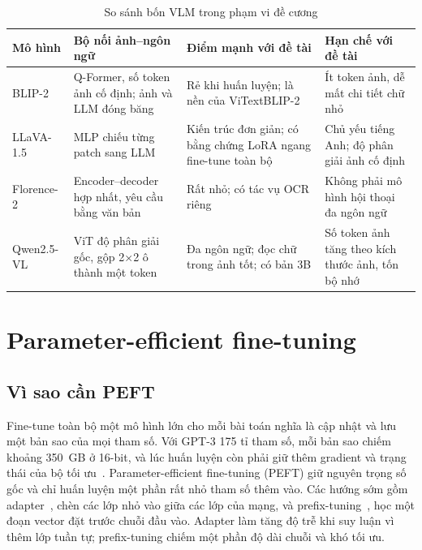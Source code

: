 \begin{table}[htbp]
\caption{So sánh bốn VLM trong phạm vi đề cương}
\label{tab:rel-vlm}
\centering
\small
\begin{tabular}{p{}p{}p{}p{}}
\toprule
\textbf{Mô hình} & \textbf{Bộ nối ảnh--ngôn ngữ} & \textbf{Điểm mạnh với đề tài} & \textbf{Hạn chế với đề tài} \\
\midrule
BLIP-2 & Q-Former, số token ảnh cố định; ảnh và LLM đóng băng & Rẻ khi huấn luyện; là nền của ViTextBLIP-2 & Ít token ảnh, dễ mất chi tiết chữ nhỏ \\
LLaVA-1.5 & MLP chiếu từng patch sang LLM & Kiến trúc đơn giản; có bằng chứng LoRA ngang fine-tune toàn bộ & Chủ yếu tiếng Anh; độ phân giải ảnh cố định \\
Florence-2 & Encoder--decoder hợp nhất, yêu cầu bằng văn bản & Rất nhỏ; có tác vụ OCR riêng & Không phải mô hình hội thoại đa ngôn ngữ \\
Qwen2.5-VL & ViT độ phân giải gốc, gộp 2×2 ô thành một token & Đa ngôn ngữ; đọc chữ trong ảnh tốt; có bản 3B & Số token ảnh tăng theo kích thước ảnh, tốn bộ nhớ \\
\bottomrule
\end{tabular}
\end{table}

\section{Parameter-efficient fine-tuning}
\label{sec:rel-peft}

\subsection{Vì sao cần PEFT}

Fine-tune toàn bộ một mô hình lớn cho mỗi bài toán nghĩa là cập nhật và lưu một
bản sao của mọi tham số. Với GPT-3 175 tỉ tham số, mỗi bản sao chiếm khoảng 350~GB
ở 16-bit, và lúc huấn luyện còn phải giữ thêm gradient và trạng thái của bộ tối
ưu~\cite{hu2022lora}. Parameter-efficient fine-tuning (PEFT) giữ nguyên trọng số
gốc và chỉ huấn luyện một phần rất nhỏ tham số thêm vào. Các hướng sớm gồm
adapter~\cite{houlsby2019adapter}, chèn các lớp nhỏ vào giữa các lớp của mạng, và
prefix-tuning~\cite{li2021prefix}, học một đoạn vector đặt trước chuỗi đầu vào.
Adapter làm tăng độ trễ khi suy luận vì thêm lớp tuần tự; prefix-tuning chiếm
một phần độ dài chuỗi và khó tối ưu.


